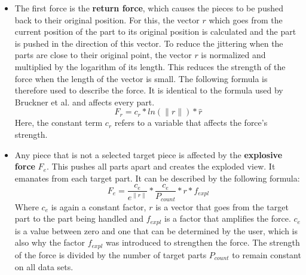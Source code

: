 \begin{itemize}
	\item The first force is the \textbf{return force}, which causes the pieces to be pushed back to their original position.
	For this, the vector $r$ which goes from the current position of the part to its original position is calculated and the part is pushed in the direction of this vector. 
	To reduce the jittering when the parts are close to their original point, the vector $r$ is normalized and multiplied by the logarithm of its length. 
	This reduces the strength of the force when the length of the vector is small. 
	The following formula is therefore used to describe the force. 
	It is identical to the formula used by Bruckner et al. and affects every part.
	\begin{equation}
		F_r = c_r * ln(\|r\|) * \hat{r}
		\label{eq:FB_return}
	\end{equation}
	Here, the constant term $c_r$ refers to a variable that affects the force's strength.
	
	\item Any piece that is not a selected target piece is affected by the \textbf{explosive force} $F_e$. This pushes all parts apart and creates the exploded view. It emanates from each target part. 
	It can be described by the following formula:
	\begin{equation}
		F_e = \frac{c_e}{e^{\|r\|}} * \frac{c_e}{P_{count}} * r * f_{expl}
		\label{eq:FB_explosion}
	\end{equation}
	Where $c_e$ is again a constant factor, $r$ is a vector that goes from the target part to the part being handled and $f_{expl}$ is a factor that amplifies the force. 
	$c_e$ is a value between zero and one that can be determined by the user, which is also why the factor $f_{expl}$ was introduced to strengthen the force. 
	The strength of the force is divided by the number of target parts $P_{count}$ to remain constant on all data sets. 
	

\end{itemize}

